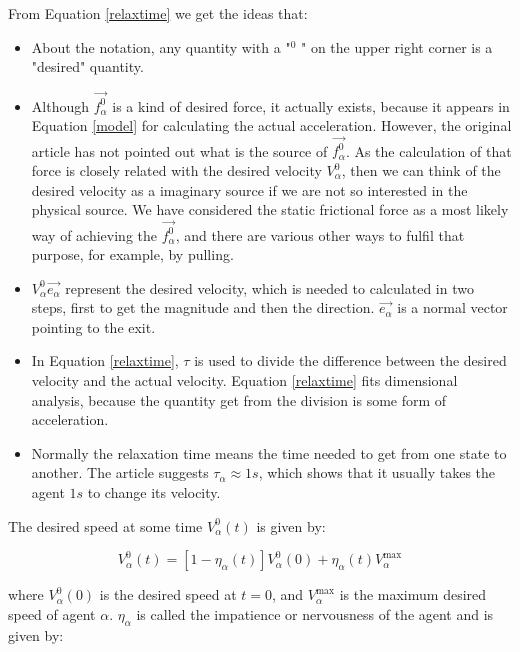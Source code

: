 From Equation \ref{relaxtime} we get the ideas that:
\begin{itemize}
\item About the notation, any quantity with a "$ ^{0} $ " on the upper right corner is a "desired" quantity.

\item Although $ \vec{f^{0}_{\alpha}} $ is a kind of desired force, it actually exists, because it appears 
in Equation \ref{model} for calculating the actual acceleration. However, the original article has not pointed 
out what is the source of  $ \vec{f^{0}_{\alpha}} $.  As the calculation of that force is closely related with 
the desired velocity $V_{\alpha}^{0}$, then we can think of the desired velocity as a imaginary source if 
we are not so interested in the physical source. We have considered the static frictional force as a most likely 
way of achieving the $ \vec{f^{0}_{\alpha}} $, and there are various other ways to fulfil that purpose, for 
example, by pulling.

\item $ V_{\alpha}^{0} \vec{e_{\alpha}} $ represent the desired velocity, which is needed to calculated in two steps, 
first to get the magnitude and then the direction. $ \vec{e_{\alpha}} $ is a normal vector pointing to the exit.

\item In Equation \ref{relaxtime}, $\tau$ is used to divide the difference between the desired velocity and the 
actual velocity. Equation \ref{relaxtime} fits dimensional analysis, because the quantity get from the division 
is some form of acceleration. 

\item Normally the relaxation time means the time needed to get from one state to another. The article 
\cite{self-org} suggests $ \tau_{\alpha}\approx 1s $, which shows that it usually takes the agent $ 1s $ to 
change its velocity.

\end{itemize}

The desired speed at some time $V_{\alpha}^{0}\left( t \right)$ is given by:

\begin{equation}\label{v0eta}
    V_{\alpha}^{0}\left( t \right) = \left[ 1 - \eta_{\alpha} \left( t \right) \right] 
    V_{\alpha}^{0} \left( 0 \right) +
    \eta_{\alpha} \left( t \right)V_{\alpha}^{\text{max}}
\end{equation}

where $V_{\alpha}^{0} \left( 0 \right)$ is the desired speed at $ t=0 $, and $V_{\alpha}^{\text{max}}$ 
is the maximum desired speed of agent $\alpha$. $\eta_{\alpha}$ is called the impatience or nervousness 
of the agent and is given by:

